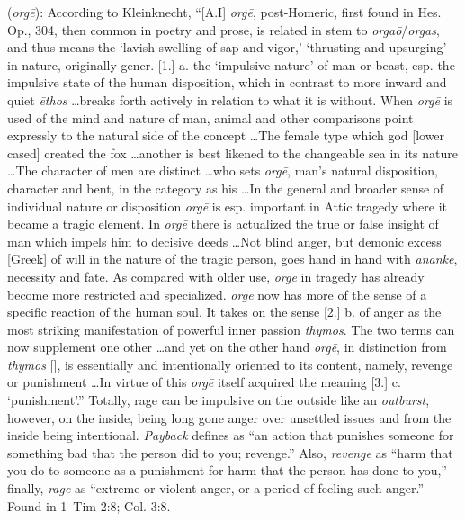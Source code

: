 \item[Rage,]

(\textit{orgē}):
According to Kleinknecht, ``[A.I] \emph{orgē}, post-Homeric, first found in Hes. Op., 304, then common in poetry and prose, is related in stem to \emph{orgaō}/\emph{orgas}, and thus means the `lavish swelling of sap and vigor,' `thrusting and upsurging' in nature, originally gener. [1.] a. the `impulsive nature' of man or beast, esp. the impulsive state of the human disposition, which in contrast to more inward and quiet \emph{ēthos} \ldots breaks forth actively in relation to what it is without. When \emph{orgē} is used of the mind and nature of man, animal and other comparisons point expressly to the natural side of the concept \ldots The female type which god [lower cased] created the fox \ldots another is best likened to the changeable sea in its nature \ldots The character of men are distinct \ldots who sets \emph{orgē}, man's natural disposition, character and bent, in the category as his \ldots In the general and broader sense of individual nature or disposition \emph{orgē} is esp. important in Attic tragedy where it became a tragic element. In \emph{orgē} there is actualized the true or false insight of man which impels him to decisive deeds \ldots Not blind anger, but demonic excess [Greek] of will in the nature of the tragic person, goes hand in hand with \emph{anankē}, necessity and fate. As compared with older use, \emph{orgē} in tragedy has already become more restricted and specialized. \emph{orgē} now has more of the sense of a specific reaction of the human soul. It takes on the sense [2.] b. of anger as the most striking manifestation of powerful inner passion \emph{thymos}. The two terms can now supplement one other \ldots and yet on the other hand  \emph{orgē}, in distinction from \emph{thymos} [], is essentially and intentionally oriented to its content, namely, revenge or punishment \ldots In virtue of this \emph{orgē} itself acquired the meaning [3.] c. `punishment'.'' 
Totally, rage can be impulsive on the outside like an \emph{outburst}, however, on the inside, being long gone anger over unsettled issues and from the inside being intentional. \emph{Payback} defines as ``an action that punishes someone for something bad that the person did to you; revenge.'' Also, \emph{revenge} as ``harm that you do to someone as a punishment for harm that the person has done to you,'' finally, \emph{rage} as ``extreme or violent anger, or a period of feeling such anger.''
Found in 1~Tim 2:8; Col. 3:8.
